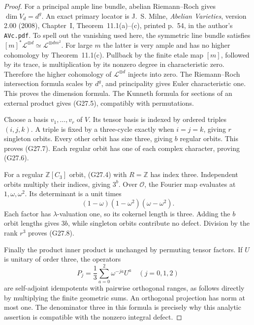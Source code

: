 \begin{proof}
For a principal ample line bundle, abelian Riemann--Roch gives
$\dim V_d=d^g$.  An exact primary locator is J.~S. Milne,
\emph{Abelian Varieties}, version 2.00 (2008), Chapter~I,
Theorem~11.1(a)--(c), printed p.~54, in the author's
\texttt{AVc.pdf}.  To spell out the vanishing used here, the
symmetric line bundle satisfies
$[m]^*\mathcal L^{\otimes d}\simeq\mathcal L^{\otimes dm^2}$.
For large $m$ the latter is very ample and has no higher
cohomology by Theorem~11.1(c).  Pullback by the finite etale map
$[m]$, followed by its trace, is multiplication by its nonzero
degree in characteristic zero.  Therefore the higher cohomology
of $\mathcal L^{\otimes d}$ injects into zero.  The
Riemann--Roch intersection formula scales by $d^g$, and
principality gives Euler characteristic one.  This proves the
dimension formula.  The Kunneth formula for sections of an
external product gives (G27.5), compatibly with permutations.

Choose a basis $v_1,\ldots,v_r$ of $V$.  Its tensor basis is
indexed by ordered triples $(i,j,k)$.  A triple is fixed by a
three-cycle exactly when $i=j=k$, giving $r$ singleton
orbits.  Every other orbit has size three, giving $b$ regular
orbits.  This proves (G27.7).  Each regular orbit has one of
each complex character, proving (G27.6).

For a regular $\mathbb Z[C_3]$ orbit, (G27.4) with $R=\mathbb Z$
has index three.  Independent orbits multiply their indices,
giving $3^b$.  Over $\mathcal O$, the Fourier map evaluates
at $1,\omega,\omega^2$.  Its determinant is a unit times
\[
              (1-\omega)(1-\omega^2)(\omega-\omega^2).
\]
Each factor has $\lambda$-valuation one, so its cokernel
length is three.  Adding the $b$ orbit lengths gives $3b$,
while singleton orbits contribute no defect.  Division by the
rank $r^3$ proves (G27.8).

Finally the product inner product is unchanged by permuting
tensor factors.  If $U$ is unitary of order three, the operators
\[
 P_j=\frac13\sum_{a=0}^2\omega^{-ja}U^a\quad(j=0,1,2)
\]
are self-adjoint idempotents with pairwise orthogonal ranges,
as follows directly by multiplying the finite geometric sums.
An orthogonal projection has norm at most one.  The denominator
three in this formula is precisely why this analytic assertion
is compatible with the nonzero integral defect.
\end{proof}

